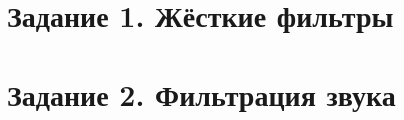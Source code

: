 \section{Задание 1. Жёсткие фильтры}

\FloatBarrier

\newpage
\section{Задание 2. Фильтрация звука}

\FloatBarrier